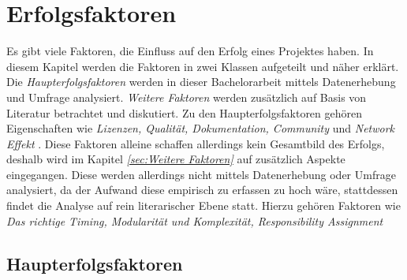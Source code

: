 \chapter{Erfolgsfaktoren}

Es gibt viele Faktoren, die Einfluss auf den Erfolg eines Projektes haben. 
In diesem Kapitel werden die Faktoren in zwei Klassen aufgeteilt und näher erklärt.
Die \textit{Haupterfolgsfaktoren} werden in dieser Bachelorarbeit mittels Datenerhebung und
Umfrage analysiert. 
\textit{Weitere Faktoren} werden zusätzlich auf Basis von Literatur betrachtet und diskutiert.
Zu den Haupterfolgsfaktoren gehören Eigenschaften wie \textit{Lizenzen, Qualität, Dokumentation, Community} 
und \textit{Network Effekt} .
Diese Faktoren alleine schaffen allerdings kein Gesamtbild des Erfolgs, deshalb wird im Kapitel 
\textit{\ref{sec:Weitere Faktoren}} auf zusätzlich Aspekte eingegangen.
Diese werden allerdings nicht mittels Datenerhebung oder Umfrage analysiert, da der Aufwand
diese empirisch zu erfassen zu hoch wäre, stattdessen findet die Analyse auf rein literarischer Ebene statt. 
Hierzu gehören Faktoren wie \textit{Das richtige Timing, Modularität und Komplexität, Responsibility
Assignment} 


\section{Haupterfolgsfaktoren} \label{sec:Haupterfolgsfaktoren}





